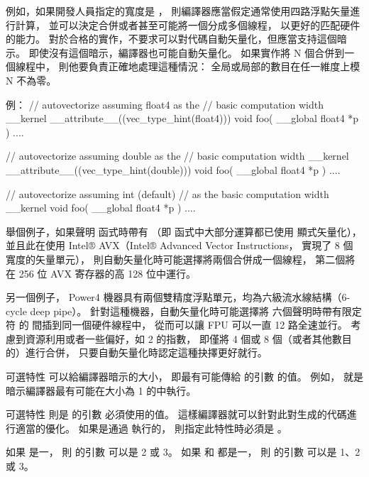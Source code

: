 例如，如果開發人員指定的寬度是 ，
則編譯器應當假定通常使用四路浮點矢量進行計算，
並可以決定合併或者甚至可能將一個分成多個線程，
以更好的匹配硬件的能力。
對於合格的實作，不要求可以對代碼自動矢量化，但應當支持這個暗示。
即使沒有這個暗示，編譯器也可能自動矢量化。
如果實作將 N 個合併到一個線程中，
則他要負責正確地處理這種情況：
全局或局部的數目在任一維度上模 N 不為零。

例：
\startclc
// autovectorize assuming float4 as the
// basic computation width
__kernel __attribute__((vec_type_hint(float4)))
void foo( __global float4 *p ) { .... }

// autovectorize assuming double as the
// basic computation width
__kernel __attribute__((vec_type_hint(double)))
void foo( __global float4 *p ) { .... }

// autovectorize assuming int (default)
// as the basic computation width
__kernel
void foo( __global float4 *p ) { .... }
\stopclc

舉個例子，如果聲明  函式時帶有
 （即  函式中大部分運算都已使用  顯式矢量化），
並且此在使用
 Intel® AVX（Intel® Advanced Vector Instructions，
實現了 8 個  寬度的矢量單元），
則自動矢量化時可能選擇將兩個合併成一個線程，
第二個將在 256 位 AVX 寄存器的高 128 位中運行。

另一個例子， Power4 機器具有兩個雙精度浮點單元，均為六級流水線結構（6-cycle deep pipe）。
針對這種機器，自動矢量化時可能選擇將
六個聲明時帶有限定符  的
間插到同一個硬件線程中，
從而可以讓 FPU 可以一直 12 路全速並行。
考慮到資源利用或者一些偏好，如 2 的指數，
即僅將 4 個或 8 個（或者其他數目的）進行合併，
只要自動矢量化時認定這種抉擇更好就行。

可選特性 
 可以給編譯器暗示的大小，
即最有可能傳給  的引數  的值。
例如， 
 就是暗示編譯器最有可能在大小為 1 的中執行。

可選特性 
 則是  的引數  必須使用的值。
這樣編譯器就可以針對此對生成的代碼進行適當的優化。
如果是通過  執行的，
則指定此特性時必須是 。

如果  是一，
則  的引數  可以是 2 或 3。
如果  和  都是一，
則  的引數  可以是 1、2 或 3。

